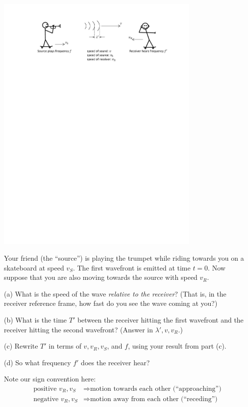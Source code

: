 \begin{center}
\includegraphics[width=0.75\textwidth]{doppler_shift_mariama/moving_observer.pdf}
\end{center}

Your friend (the ``source'') is playing the trumpet while riding towards you on a skateboard at speed $v_S$.  The first wavefront is emitted at time $t=0$. Now suppose that you are also moving towards the source with speed $v_R$.  

(a) What is the speed of the wave \textit{relative to the receiver}?  (That is, in the receiver reference frame, how fast do you see the wave coming at you?) 
\answerspace{30mm}

(b) What is the time $T'$ between the receiver hitting the first wavefront and the receiver hitting the second wavefront? (Answer in $\lambda', v, v_R$.)
\answerspace{30mm}

(c) Rewrite $T'$ in terms of $v, v_R, v_S$, and $f$, using your result from part (c).
\answerspace{30mm}

(d) So what frequency $f'$ does the receiver hear?

\vfill

Note our sign convention here:
\begin{align*}
\textrm{positive } v_R, v_S &\Longrightarrow \textrm{motion towards each other (``approaching'')} \\
\textrm{negative } v_R, v_S &\Longrightarrow \textrm{motion away from each other (``receding'')} 
\end{align*}


